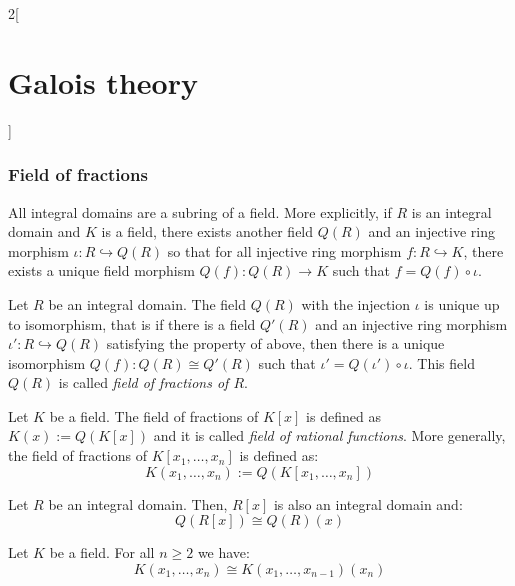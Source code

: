 \documentclass[../../../main.tex]{subfiles}
\begin{document}
\begin{multicols}{2}[\section{Galois theory}]
  \subsubsection*{Field of fractions}
  \begin{theorem}
    All integral domains are a subring of a field. More explicitly, if $R$ is an integral domain and $K$ is a field, there exists another field $Q(R)$ and an injective ring morphism $\iota:R\hookrightarrow Q(R)$ so that for all injective ring morphism $f:R\hookrightarrow K$, there exists a unique field morphism $Q(f):Q(R)\rightarrow K$ such that $f=Q(f)\circ\iota$.
  \end{theorem}
  \begin{corollary}
    Let $R$ be an integral domain. The field $Q(R)$ with the injection $\iota$ is unique up to isomorphism, that is if there is a field $Q'(R)$ and an injective ring morphism $\iota':R\hookrightarrow Q(R)$ satisfying the property of above, then there is a unique isomorphism $Q(f):Q(R)\cong Q'(R)$ such that $\iota'=Q(\iota')\circ\iota$. This field $Q(R)$ is called \textit{field of fractions of $R$}.
  \end{corollary}
  \begin{definition}
    Let $K$ be a field. The field of fractions of $K[x]$ is defined as $K(x):=Q(K[x])$ and it is called \textit{field of rational functions}. More generally, the field of fractions of $K[x_1,\ldots,x_n]$ is defined as: $$K(x_1,\ldots,x_n):=Q(K[x_1,\ldots,x_n])$$
  \end{definition}
  \begin{lemma}
    Let $R$ be an integral domain. Then, $R[x]$ is also an integral domain and: $$Q(R[x])\cong Q(R)(x)$$
  \end{lemma}
  \begin{corollary}
    Let $K$ be a field. For all $n\geq 2$ we have: $$K(x_1,\ldots,x_n)\cong K(x_1,\ldots,x_{n-1})(x_n)$$
  \end{corollary}

\end{multicols}
\end{document}
